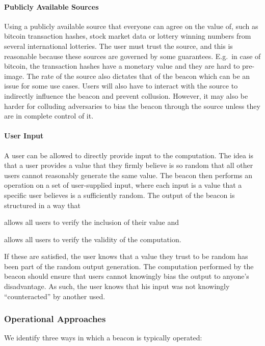 \paragraph{Publicly Available Sources} Using a publicly available source that everyone can agree on the value of, such as bitcoin transaction hashes, stock market data or lottery winning numbers from several international lotteries.
The user must trust the source, and this is reasonable because these sources are governed by some guarantees. E.g.\ in case of bitcoin, the transaction hashes have a monetary value and they are hard to pre-image. The rate of the source also dictates that of the beacon which can be an issue for some use cases. Users will also have to interact with the source to indirectly influence the beacon and prevent collusion. However, it may also be harder for colluding adversaries to bias the beacon through the source unless they are in complete control of it.

\paragraph{User Input}
A user can be allowed to directly provide input to the computation.
The idea is that a user provides a value that they firmly believe is so random that all other users cannot reasonably generate the same value.
The beacon then performs an operation on a set of user-supplied input, where each input is a value that a specific user believes is a sufficiently random. The output of the beacon is structured in a way that
\begin{eletterate*}
    \item allows all users to verify the inclusion of their value and
    \item allows all users to verify the validity of the computation.
\end{eletterate*}

If these are satisfied, the user knows that a value they trust to be random has been part of the random output generation. The computation performed by the beacon should ensure that users cannot knowingly bias the output to anyone's disadvantage. As such, the user knows that his input was not knowingly \enquote{counteracted} by another used.

\subsubsection{Operational Approaches}
We identify three ways in which a beacon is typically operated:

